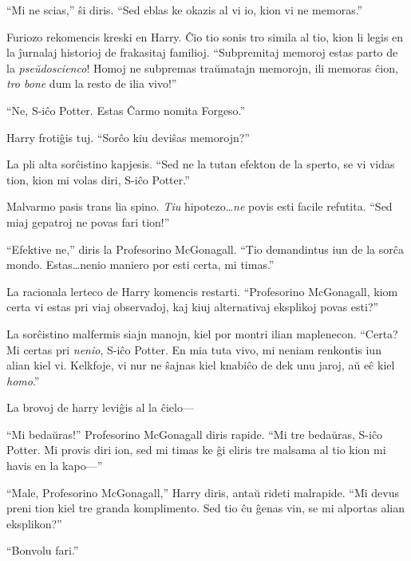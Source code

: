 ``Mi ne scias,'' ŝi diris. ``Sed eblas ke okazis al vi io, kion
vi ne memoras.''

Furiozo rekomencis kreski en Harry. Ĉio tio sonis tro simila al tio,
kion li legis en la ĵurnalaj historioj de frakasitaj
familioj. ``Subpremitaj memoroj estas parto de la
\emph{pseŭdoscienco}! Homoj ne subpremas traŭmatajn memorojn, ili
memoras ĉion, \emph{tro bone} dum la resto de ilia vivo!''

``Ne, S-iĉo Potter. Estas Ĉarmo nomita Forgeso.''

Harry frotiĝis tuj. ``Sorĉo kiu deviŝas memorojn?''

La pli alta sorĉistino kapjesis. ``Sed ne la tutan efekton de la
sperto, se vi vidas tion, kion mi volas diri, S-iĉo Potter.''

Malvarmo pasis trans lia spino. \emph{Tiu} hipotezo\ldots \emph{ne}
povis esti facile refutita. ``Sed miaj gepatroj ne povas fari tion!''

``Efektive ne,'' diris la Profesorino McGonagall. ``Tio demandintus
iun de la sorĉa mondo. Estas\ldots nenio maniero por esti certa, mi
timas.''

La racionala lerteco de Harry komencis restarti. ``Profesorino
McGonagall, kiom certa vi estas pri viaj observadoj, kaj kiuj
alternativaj eksplikoj povas esti?''

La sorĉistino malfermis siajn manojn, kiel por montri ilian
maplenecon. ``Certa? Mi certas pri \emph{nenio}, S-iĉo Potter. En mia
tuta vivo, mi neniam renkontis iun alian kiel vi. Kelkfoje, vi nur ne
ŝajnas kiel knabiĉo de dek unu jaroj, aŭ eĉ kiel \emph{homo}.''

La brovoj de harry leviĝis al la ĉielo—

``Mi bedaŭras!'' Profesorino McGonagall diris rapide. ``Mi tre
bedaŭras, S-iĉo Potter. Mi provis diri ion, sed mi timas ke ĝi eliris
tre malsama al tio kion mi havis en la kapo—''

``Male, Profesorino McGonagall,'' Harry diris, antaŭ rideti
malrapide. ``Mi devus preni tion kiel tre granda komplimento. Sed tio
ĉu ĝenas vin, se mi alportas alian eksplikon?''

``Bonvolu fari.''

